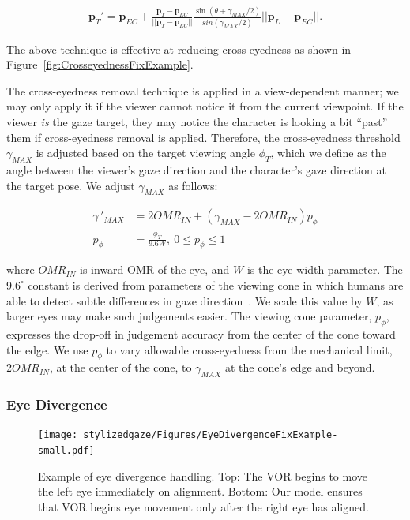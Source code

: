 \begin{align}
\mathbf{p}_T' = \mathbf{p}_{EC} + \frac{\mathbf{p}_T - \mathbf{p}_{EC}}{||\mathbf{p}_T - \mathbf{p}_{EC}||} \frac{\sin(\theta + \gamma_{MAX}/2)}{sin(\gamma_{MAX}/2)}||\mathbf{p}_L - \mathbf{p}_{EC}||.
\end{align}

The above technique is effective at reducing cross-eyedness as shown in Figure~\ref{fig:CrosseyednessFixExample}.

The cross-eyedness removal technique is applied in a view-dependent manner; we may only apply it if the viewer cannot notice it from the current viewpoint.
If the viewer \emph{is} the gaze target, they may notice the character is looking a bit ``past'' them if cross-eyedness removal is applied.
Therefore, the cross-eyedness threshold $\gamma_{MAX}$ is adjusted based on the target viewing angle $\phi_T$, which we define as the angle between the viewer's gaze direction and the character's gaze direction at the target pose. We adjust $\gamma_{MAX}$ as follows:

\begin{align}
\label{eq:CrosseyednessFix}
\gamma\,'_{MAX} &= 2 OMR_{IN} + (\gamma_{MAX} - 2 OMR_{IN}) p_{\phi} \\
p_{\phi} &= \frac{\phi_T}{9.6W},~ 0 \le p_{\phi} \le 1 \nonumber
\end{align}

where $OMR_{IN}$ is inward OMR of the eye, and $W$ is the eye width parameter. The $9.6^{\circ}$ constant is derived from parameters of the viewing cone in which humans are able to detect subtle differences in gaze direction~\citep{argyle1976gaze}. We scale this value by $W$, as larger eyes may make such judgements easier. The viewing cone parameter, $p_{\phi}$, expresses the drop-off in judgement accuracy from the center of the cone toward the edge. We use $p_{\phi}$ to vary allowable cross-eyedness from the mechanical limit, $2 OMR_{IN}$, at the center of the cone, to $\gamma_{MAX}$ at the cone's edge and beyond.

\subsubsection{Eye Divergence}

\begin{figure}
\centering
\texttt{[image: stylizedgaze/Figures/EyeDivergenceFixExample-small.pdf]}
\caption{Example of eye divergence handling. Top: The VOR begins to move the left eye immediately on alignment. Bottom: Our model ensures that VOR begins eye movement only after the right eye has aligned.}
\label{fig:EyeDivergenceFixExample}
\end{figure}

